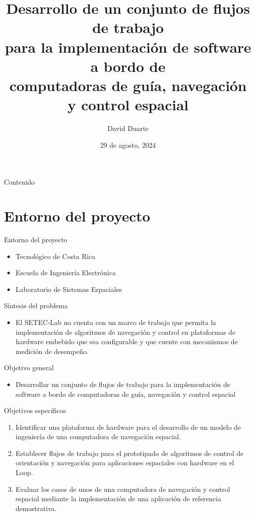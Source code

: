 \documentclass[10pt,aspectratio=169]{beamer} %
\title[Anteproyecto]{Desarrollo de un conjunto de flujos de trabajo \\
                                  para la implementación de software a bordo de  \\
                                  computadoras de guía, navegación y control espacial}
\institute[TEC]{Escuela de Ingeniería Electrónica \\ Tecnológico de Costa Rica}
\date[Noviembre 2023]{29 de agosto, 2024}
\author[D.\ Duarte]{David Duarte}
\begin{document}
\graphicspath{{./}{./fig/}}

\begin{frame}
  \titlepage
\end{frame}


\begin{frame}{Contenido}
  \tableofcontents
\end{frame}

\section{Entorno del proyecto}

\begin{frame}{Entorno del proyecto}
  \begin{itemize}
  \item Tecnológico de Costa Rica
  \item Escuela de Ingeniería Electrónica
  \item Laboratorio de Sistemas Espaciales
  \end{itemize}
\end{frame}

\begin{frame}{Síntesis del problema}
  
  \begin{itemize}
  \item El SETEC-Lab no cuenta con un marco de trabajo que permita la implementación 
  de algoritmos de navegación y control en plataformas de hardware embebido que sea 
  configurable y que cuente con mecanismos de medición de desempeño.
  \end{itemize}
\end{frame}

\begin{frame}{Objetivo general}
  
  \begin{itemize}
  \item Desarrollar un conjunto de flujos de trabajo para la implementación de software 
  a bordo de computadoras de guía, navegación y control espacial 
  \end{itemize}
\end{frame}

\begin{frame}{Objetivos específicos}
  \begin{enumerate}
    \item Identificar una plataforma de hardware para el desarrollo de un modelo de ingeniería de una computadora de navegación espacial.
    \item Establecer flujos de trabajo para el prototipado de algoritmos de control de orientación y navegación para aplicaciones espaciales 
          con hardware en el Loop.
    \item Evaluar los casos de unos de una computadora de navegación y control espacial mediante la implementación de una aplicación de 
          referencia demostrativa.
  \end{enumerate}
\end{frame}
\end{document}
